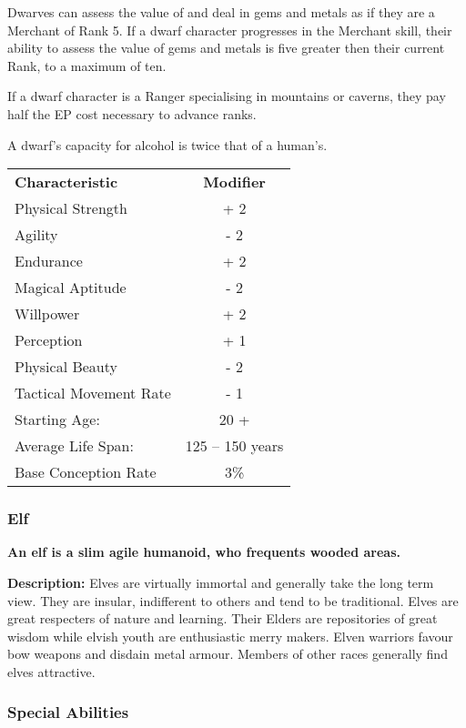 \begin{multicols*}{3}
\begin{Enumerate}
\item
Dwarves can assess the value of and deal in gems and metals as if they
are a Merchant of Rank 5. If a dwarf character progresses in the
Merchant skill, their ability to assess the value of gems and metals
is five greater then their current Rank, to a maximum of ten.

\item
If a dwarf character is a Ranger specialising in mountains or caverns,
they pay half the EP cost necessary to advance ranks.

\item
A dwarf's capacity for alcohol is twice that of a human's.
\end{Enumerate}

\begin{tabularx}{\linewidth}{Xc}
\textbf{Characteristic} & \textbf{Modifier} \\
Physical Strength	& + 2 \\
Agility			& - 2 \\
Endurance		& + 2 \\
Magical Aptitude	& - 2 \\
Willpower		& + 2 \\
Perception		& + 1 \\
Physical Beauty		& - 2 \\
Tactical Movement Rate	& - 1 \\
Starting Age:		& 20 + \\
Average Life Span:	& 125 -- 150 years \\
Base Conception Rate	& 3\% \\
\end{tabularx}

\subsubsection{Elf}

\textbf{An elf is a slim agile humanoid, who frequents wooded areas.}

\textbf{Description:} Elves are virtually immortal and generally take
the long term view. They are insular, indifferent to others and tend
to be traditional.  Elves are great respecters of nature and
learning. Their Elders are repositories of great wisdom while elvish
youth are enthusiastic merry makers. Elven warriors favour bow weapons
and disdain metal armour. Members of other races generally find elves
attractive.

\subsubsection{Special Abilities}


\end{multicols*}
